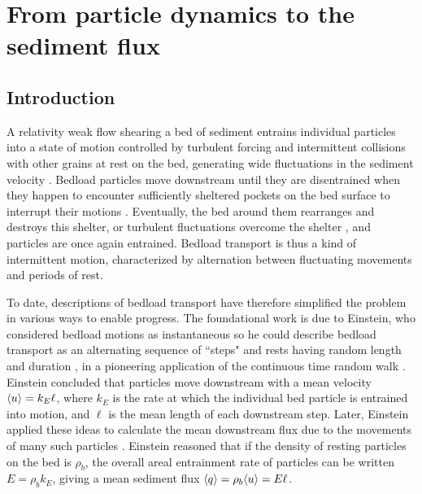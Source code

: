 
\chapter{From particle dynamics to the sediment flux}
\label{ch:flux}
\section{Introduction}

A relativity weak flow shearing a bed of sediment entrains individual particles into a state of motion controlled by turbulent forcing and intermittent collisions with other grains at rest on the bed, generating wide fluctuations in the sediment velocity \citep{Heyman2016,Fathel2015}.
Bedload particles move downstream until they are disentrained when they happen to encounter sufficiently sheltered pockets on the bed surface to interrupt their motions \citep{Charru2004,Gordon1972}.
Eventually, the bed around them rearranges and destroys this shelter, or turbulent fluctuations overcome the shelter \citep{Celik2014,Valyrakis2010}, and particles are once again entrained.
Bedload transport is thus a kind of intermittent motion, characterized by alternation between fluctuating movements and periods of rest.

To date, descriptions of bedload transport have therefore simplified the problem in various ways to enable progress.
The foundational work is due to Einstein, who considered bedload motions as instantaneous so he could describe bedload transport as an alternating sequence of ``steps" and rests having random length and duration \citep{Einstein1937}, in a pioneering application of the continuous time random walk \citep{Montroll1965}.
Einstein concluded that particles move downstream with a mean velocity $\langle u \rangle = k_E \ell$, where $k_E$ is the rate at which the individual bed particle is entrained into motion, and $\ell$ is the mean length of each downstream step.
Later, Einstein applied these ideas to calculate the mean downstream flux due to the movements of many such particles \citep{Einstein1950}. Einstein reasoned that if the density of resting particles on the bed is $\rho_b$, the overall areal entrainment rate of particles can be written $E = \rho_b k_E$, giving a mean sediment flux $\langle q \rangle = \rho_b \langle u \rangle  = E \ell $.


